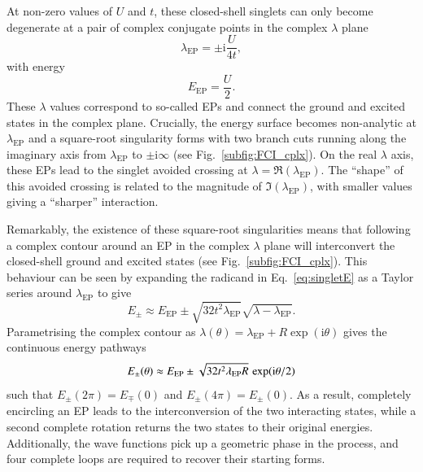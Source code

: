 \documentclass[aps,prb,reprint,noshowkeys,superscriptaddress]{revtex4-1}
\renewcommand{\i}{\mathrm{i}} %
\begin{document}
At non-zero values of $U$ and $t$, these closed-shell singlets can only become degenerate at a pair of complex conjugate points in the complex $\lambda$ plane 
\begin{equation}
\lambda_{\text{EP}} = \pm  \i \frac{U}{4t},
\end{equation}
with energy
\begin{equation}
\label{eq:E_EP}
	E_\text{EP} = \frac{U}{2}.
\end{equation}
These $\lambda$ values correspond to so-called EPs and connect the ground and excited states in the complex plane.
Crucially, the energy surface becomes non-analytic at $\lambda_{\text{EP}}$ and a square-root singularity forms with two branch cuts running along the imaginary axis from $\lambda_{\text{EP}}$  to $\pm \i \infty$ (see Fig.~\ref{subfig:FCI_cplx}).
On the real $\lambda$ axis, these EPs lead to the singlet avoided crossing at $\lambda = \Re(\lambda_{\text{EP}})$.
The ``shape'' of this avoided crossing is related to the magnitude of $\Im(\lambda_{\text{EP}})$, with smaller values giving a ``sharper'' interaction.

Remarkably, the existence of these square-root singularities means that following a complex contour around an EP in the complex $\lambda$ plane will interconvert the closed-shell ground and excited states (see Fig.~\ref{subfig:FCI_cplx}).
This behaviour can be seen by expanding the radicand in Eq.~\eqref{eq:singletE} as a Taylor series around $\lambda_{\text{EP}}$ to give
\begin{equation}
E_{\pm} \approx E_{\text{EP}} \pm \sqrt{32t^2 \lambda_{\text{EP}}} \sqrt{\lambda - \lambda_{\text{EP}}}.
\end{equation}
Parametrising the complex contour as $\lambda(\theta) = \lambda_{\text{EP}} + R \exp(\i \theta)$ gives the continuous energy pathways 
\begin{equation}
E_{\pm} \qty(\theta) \approx E_{\text{EP}} \pm \sqrt{32t^2 \lambda_{\text{EP}} R}\, \exp(\i \theta/2)
\end{equation}
such that $E_{\pm}(2\pi)  = E_{\mp}(0)$ and $E_{\pm}(4\pi)  = E_{\pm}(0)$.
As a result, completely encircling an EP leads to the interconversion of the two interacting states, while a second complete rotation returns the two states to their original energies.
Additionally, the wave functions pick up a geometric phase in the process, and four complete loops are required to recover their starting forms.\cite{MoiseyevBook}
\end{document}
